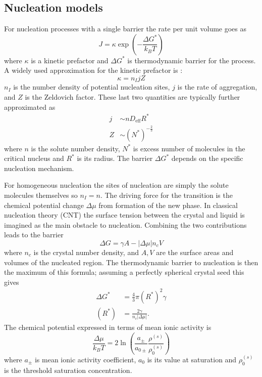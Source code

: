 \documentclass[11pt,twoside]{report}
\begin{document}
\subsection{Nucleation models}

For nucleation processes with a single barrier the rate per unit volume goes as
\begin{equation}\label{eq:nucleation-rate-barrier}
  J = \kappa \exp{\left(-\frac{\Delta G^{*}}{k_B T}\right)}
\end{equation}
where $\kappa$ is a kinetic prefactor and $\Delta G^*$ is thermodynamic barrier for the process.
A widely used approximation for the kinetic prefactor is \cite{SearJPCM2007}:
\begin{equation}
  \kappa = n_I j Z
\end{equation}
$n_I$ is the number density of potential nucleation sites, $j$ is the rate of aggregation, and $Z$ is the Zeldovich factor.
These last two quantities are typically further approximated as \cite{SearJPCM2007}
\begin{subequations}
  \begin{align}
    j &\sim n D_\mathrm{eff} R^* \\
    Z &\sim (N^*)^{-\tfrac{2}{3}}
  \end{align}
\end{subequations}
where $n$ is the solute number density, $N^*$ is excess number of molecules in the critical nucleus and $R^*$ is its radius.
The barrier $\Delta G^*$ depends on the specific nucleation mechanism.

For homogeneous nucleation the sites of nucleation are simply the solute molecules themselves so $n_I = n$.
The driving force for the transition is the chemical potential change $\Delta \mu$ from formation of the new phase.
In classical nucleation theory (CNT) the surface tension between the crystal and liquid is imagined as the main obstacle to nucleation.
Combining the two contributions leads to the barrier
\begin{equation}
  \Delta G = \gamma A - |\Delta \mu| n_c V
\end{equation}
where $n_c$ is the crystal number density, and $A, V$ are the surface areas and volumes of the nucleated region.
The thermodynamic barrier to nucleation is then the maximum of this formula; assuming a perfectly spherical crystal seed this gives
\begin{align}\label{eq:cnt-barrier}
  \Delta G^{*} &= \frac{4}{3} \pi (R^{*})^2 \gamma \\
  (R^{*}) &= \frac{2\gamma}{n_c |\Delta\mu|}.
\end{align}
The chemical potential expressed in terms of mean ionic activity is\cite{DesarnaudJPCL2014}
\begin{equation}
  \frac{\Delta \mu}{k_B T}
  =
  2 \ln{\left( \frac{a_\pm}{a_{0\pm}} \frac{\rho^{(s)}}{\rho^{(s)}_0} \right)}
\end{equation}
where $a_\pm$ is mean ionic activity coefficient, $a_0$ is its value at saturation and $\rho^{(s)}_0$ is the threshold saturation concentration.
\end{document}
